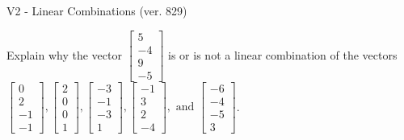 \begin{exercise}
  \begin{exerciseTitle}V2 - Linear Combinations (ver. 829)\end{exerciseTitle}
  \begin{exerciseStatement}
    Explain why the vector \(\left[\begin{array}{c}
5 \\
-4 \\
9 \\
-5
\end{array}\right]\)  is or is not a linear 
	combination of the vectors \(\left[\begin{array}{c}
0 \\
2 \\
-1 \\
-1
\end{array}\right] , \left[\begin{array}{c}
2 \\
0 \\
0 \\
1
\end{array}\right] , \left[\begin{array}{c}
-3 \\
-1 \\
-3 \\
1
\end{array}\right] , \left[\begin{array}{c}
-1 \\
3 \\
2 \\
-4
\end{array}\right] , \text{ and } \left[\begin{array}{c}
-6 \\
-4 \\
-5 \\
3
\end{array}\right]\).
	



\end{exerciseStatement}
\end{exercise}
